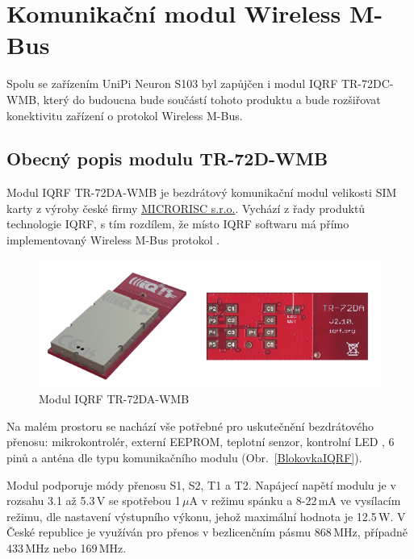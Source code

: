\chapter{Komunikační modul Wireless M-Bus}

Spolu se zařízením UniPi Neuron S103 byl zapůjčen i modul IQRF TR-72DC-WMB, který do budoucna bude součástí tohoto produktu a bude rozšiřovat konektivitu zařízení o protokol Wireless M-Bus. 

\section{Obecný popis modulu TR-72D-WMB}

Modul IQRF TR-72DA-WMB je bezdrátový komunikační modul velikosti SIM karty z výroby české firmy \href{http://microrisc.com/cs/}{MICRORISC s.r.o.}. Vychází z řady produktů technologie IQRF, s tím rozdílem, že místo IQRF softwaru má přímo implementovaný Wireless M-Bus protokol \cite{ModulIQRF}. 

 \begin{figure}[!ht]
\vspace{-20pt}
  \begin{center}
    \includegraphics[scale=0.76]{obrazky/modul_modul}
  \end{center}
	\vspace{-20pt}
  \caption{Modul IQRF TR-72DA-WMB \cite{ModulIQRF}}
	\vspace{-10pt}
\end{figure}

Na malém prostoru se nachází vše potřebné pro uskutečnění bezdrátového přenosu: mikrokontrolér, externí EEPROM, teplotní senzor, kontrolní LED , 6 pinů a anténa dle typu komunikačního modulu (Obr.~\ref{BlokovkaIQRF}).



Modul podporuje módy přenosu S1, S2, T1 a T2. Napájecí napětí modulu je v rozsahu 3.1 až 5.3\,V se spotřebou 1\,$\mu$A v režimu spánku a 8-22\,mA ve vysílacím režimu, dle nastavení výstupního výkonu, jehož maximální hodnota je 12.5\,W.
V České republice je využíván pro přenos v bezlicenčním pásmu 868\,MHz, případně 433\,MHz nebo 169\,MHz.\newline

